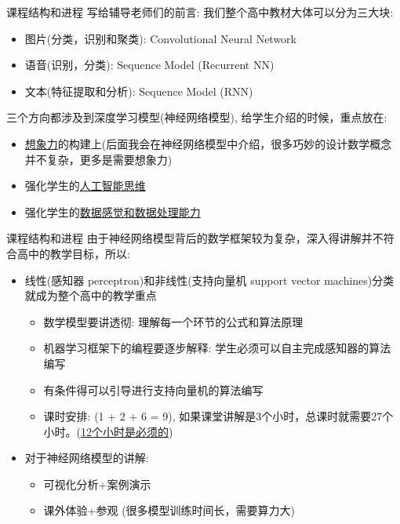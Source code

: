\documentclass[handout]{ctexbeamer}
\begin{document}
\begin{frame}{课程结构和进程}
	写给辅导老师们的前言: 我们整个高中教材大体可以分为三大块:
	\begin{itemize}
	\setlength\itemsep{1em}
		\item 图片(分类，识别和聚类): Convolutional Neural Network
		\item 语音(识别，分类): Sequence Model (Recurrent NN)
		\item 文本(特征提取和分析): Sequence Model (RNN)
	\end{itemize}
	
	三个方向都涉及到深度学习模型(神经网络模型), 给学生介绍的时候，重点放在:
	
	\hfil
	\begin{itemize}
	\setlength\itemsep{1em}
		\item \underline{想象力}的构建上(后面我会在神经网络模型中介绍，很多巧妙的设计数学概念并不复杂，更多是需要想象力)
		\item 强化学生的\underline{人工智能思维}
		\item 强化学生的\underline{数据感觉和数据处理能力}
	\end{itemize}
\end{frame}

\begin{frame}{课程结构和进程}
由于神经网络模型背后的数学框架较为复杂，深入得讲解并不符合高中的教学目标，所以:

\hfill
\begin{itemize}
	\item 线性(感知器 perceptron)和非线性(支持向量机 support vector machines)分类就成为整个高中的教学重点 \begin{itemize}
	\item 数学模型要讲透彻: 理解每一个环节的公式和算法原理
	\item 机器学习框架下的编程要逐步解释: 学生必须可以自主完成感知器的算法编写
	\item 有条件得可以引导进行支持向量机的算法编写
	\item 课时安排: (1 + 2 + 6 = 9), 如果课堂讲解是3个小时，总课时就需要27个小时。(\underline{12个小时是必须的})
	\end{itemize}
	\item 对于神经网络模型的讲解: \begin{itemize}
	\item 可视化分析+案例演示
	\item 课外体验+参观 (很多模型训练时间长，需要算力大)
	\end{itemize}
\end{itemize}	
\end{frame}
\end{document}
